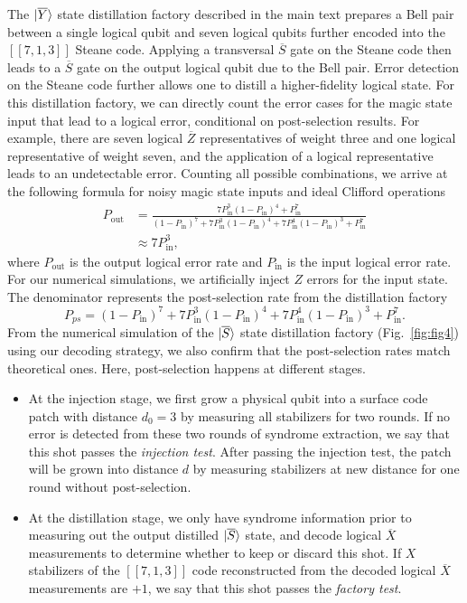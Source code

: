 The $|{\overline{Y}}\rangle$ state distillation factory described in the main text prepares a Bell pair between a single logical qubit and seven logical qubits further encoded into the $[[7,1,3]]$ Steane code.
%
Applying a transversal $\overline{S}$ gate on the Steane code then leads to a $\overline{S}$ gate on the output logical qubit due to the Bell pair.
%
Error detection on the Steane code further allows one to distill a higher-fidelity logical state.
%
For this distillation factory, we can directly count the error cases for the magic state input that lead to a logical error, conditional on post-selection results.
%
For example, there are seven logical $\overline{Z}$ representatives of weight three and one logical representative of weight seven, and the application of a logical representative leads to an undetectable error.
%
Counting all possible combinations, we arrive at the following formula for noisy magic state inputs and ideal Clifford operations
\begin{align}
P_{\mathrm{out}}&=\frac{7P_{\mathrm{in}}^3(1-P_{\mathrm{in}})^4+P_{\mathrm{in}}^7}{(1-P_{\mathrm{in}})^7+7P_{\mathrm{in}}^3(1-P_{\mathrm{in}})^4+7P_{\mathrm{in}}^4(1-P_{\mathrm{in}})^3+P_{\mathrm{in}}^7}\nonumber\\
&\approx 7P_{\mathrm{in}}^3,
\end{align}
where $P_{\mathrm{out}}$ is the output logical error rate and $P_{\mathrm{in}}$ is the input logical error rate. For our numerical simulations, we artificially inject $Z$ errors for the input state. The denominator represents the post-selection rate from the distillation factory
\begin{equation}
    P_{ps} = (1-P_{\mathrm{in}})^7+7P_{\mathrm{in}}^3(1-P_{\mathrm{in}})^4+7P_{\mathrm{in}}^4(1-P_{\mathrm{in}})^3+P_{\mathrm{in}}^7.
    \label{eq:s-post-selection-rate}
\end{equation}
From the numerical simulation of the $|{\overline{S}}\rangle$ state distillation factory (Fig.~\ref{fig:fig4}) using our decoding strategy, we also confirm that the post-selection rates match theoretical ones. Here, post-selection happens at different stages. 
\begin{itemize}
    \item At the injection stage, we first grow a physical qubit into a surface code patch with distance $d_0=3$ by measuring all stabilizers for two rounds. If no error is detected from these two rounds of syndrome extraction, we say that this shot passes the \textit{injection test}. After passing the injection test, the patch will be grown into distance $d$ by measuring stabilizers at new distance for one round without post-selection.
    \item At the distillation stage, we only have syndrome information prior to measuring out the output distilled $|{\overline{S}}\rangle$ state, and decode logical $\overline{X}$ measurements to determine whether to keep or discard this shot. If $X$ stabilizers of the $[[7,1,3]]$ code reconstructed from the decoded logical $\overline{X}$ measurements are $+1$, we say that this shot passes the \textit{factory test}.
\end{itemize}
